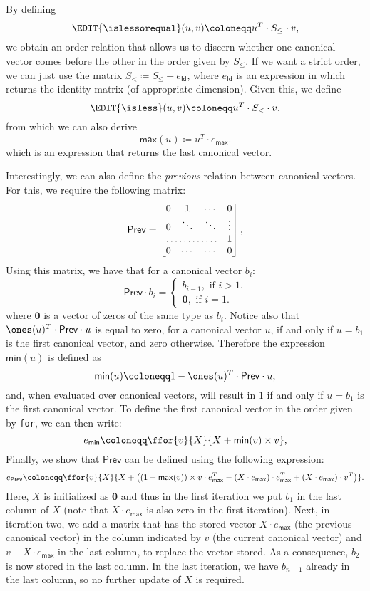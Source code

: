 By defining 
$$
\EDIT{\islessorequal}(u,v) \coloneqq  u^T\cdot S_{\leq} \cdot v,
$$
we obtain an order relation that allows us to discern whether one canonical vector comes before 
the other in the order given by $S_{\leq}$. If we want a strict order, we can just use the matrix
$S_< \coloneqq  S_{\leq} - e_{\mathsf{Id}}$, where $e_{\mathsf{Id}}$ is an expression in \langfor which returns the identity matrix (of appropriate dimension). Given this, we define
$$\EDIT{\isless}(u,v) \coloneqq  u^T\cdot S_{<} \cdot v.$$
from which we can also derive 
$$
\mathsf{max}(u)\coloneqq u^T\cdot e_{\mathsf{max}}.
$$
which is an expression that returns the last canonical vector.

Interestingly, we can also define the \textit{previous} relation between canonical vectors. 
For this, we require the following matrix:
\[
\mathsf{Prev} = \begin{bmatrix}
    0 & 1 & \cdots &  0 \\
    0 & \ddots & \ddots & \vdots \\
    \hdotsfor{3} & 1 \\
    0 & \cdots & \cdots & 0
\end{bmatrix},
\]
Using this matrix, we have that for a canonical vector $b_i$:
\[
\mathsf{Prev}\cdot b_i=\begin{cases}
               b_{i-1}, \text{ if } i > 1. \\
              \mathbf{0}, \text{ if } i = 1.
            \end{cases}
\]
where $\mathbf{0}$ is a vector of zeros of the same type as $b_i$. Notice also that $\ones(u)^T\cdot \mathsf{Prev} \cdot u$ is equal to zero, for a canonical vector $u$, if and only if $u = b_1$ is the first canonical vector, and zero otherwise.
Therefore the expression $\mathsf{min}(u)$ is defined as $$\mathsf{min}(u) \coloneqq  1 - \ones(u)^T\cdot \mathsf{Prev} \cdot u,$$ and, when evaluated over canonical vectors, will result in $1$ if and only if $u=b_1$ is the first canonical vector.
To define the first canonical vector in the order given by \texttt{for}, we can then write:
$$e_{\mathsf{min}} \coloneqq  \ffor{v}{X}{X + \mathsf{min}(v)\times v},$$
Finally, we show that $\mathsf{Prev}$ can be defined using the following \langfor expression:
$$e_{\mathsf{Prev}}\coloneqq  \ffor{v}{X}{X + \bigl((1 - \mathsf{max}(v))\times v\cdot e_{\mathsf{max}}^T - (X\cdot e_{\mathsf{max}})\cdot e_{\mathsf{max}}^T + (X\cdot e_{\mathsf{max}})\cdot v^T\bigr)}.$$
Here, $X$ is initialized as $\mathbf{0}$ and thus in the first iteration we put
 $b_1$ in the last column of $X$ (note that $X\cdot e_{\mathsf{max}}$ is also zero in the first iteration). Next, in iteration two, we add a matrix that has the stored vector $X\cdot e_{\mathsf{max}}$ (the previous canonical vector) in the column indicated by $v$ (the current canonical vector) and $v-X\cdot e_{\mathsf{max}}$ in the last column, to replace the vector stored. As a consequence, $b_2$ is now stored in the last column. In the last iteration, we have $b_{n-1}$ already in the last column, so no further update of $X$ is required.
 
